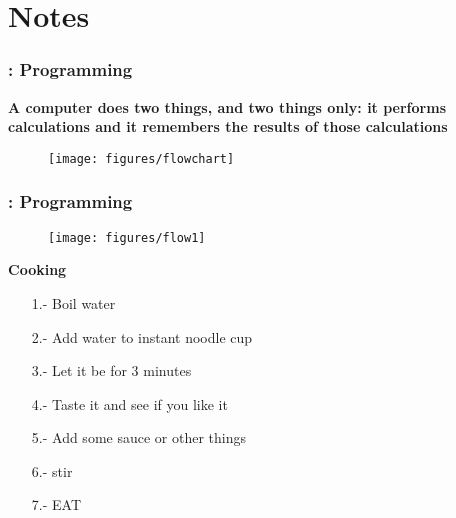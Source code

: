 \documentclass[11pt]{beamer}
\begin{document}
\section{Notes}
\begin{frame}
	\frametitle{\secname: Programming}
	
	\begin{minipage}[t]{\linewidth}
		\vspace{-13pt} \centering
		\textbf{A computer does two things, and two things only: it performs calculations and it remembers the results of those calculations}
	\end{minipage}
	\begin{minipage}[t]{\linewidth}
		\vspace{-3pt}
		\begin{figure}[h!]
			\centering
			\texttt{[image: figures/flowchart]}
		\end{figure}
	\end{minipage}	
	
\end{frame}


\begin{frame}
	\frametitle{\secname: Programming}
	\centering
	\begin{minipage}[t]{0.55\linewidth}
		\vspace{-17pt}
		\begin{figure}[h!]
			\centering
			\texttt{[image: figures/flow1]}
		\end{figure}
	\end{minipage}
	\begin{minipage}[t]{0.35\linewidth}
		\textbf{Cooking}\\
		\begin{enumerate}
			\setlength{\itemsep}{0pt}
			\item[1.-] Boil water
			\item[2.-] Add water to instant noodle cup
			\item[3.-] Let it be for 3 minutes
			\item[4.-] Taste it and see if you like it
			\item[5.-] Add some sauce or other things
			\item[6.-] stir
			\item[7.-] EAT
		\end{enumerate}
	\end{minipage}	
\end{frame}
\end{document}
